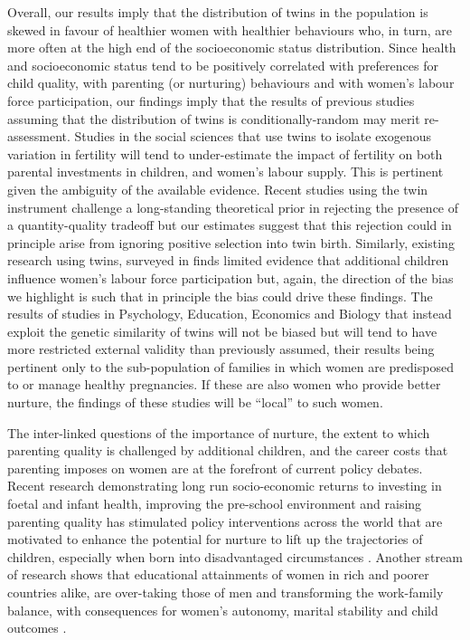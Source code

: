 \documentclass[11pt]{article}
\begin{document}
Overall, our results imply that the distribution of twins in the population is skewed in favour of healthier women with healthier behaviours who, in turn, are more often at the high end of the socioeconomic status distribution. Since health and socioeconomic status tend to be positively correlated with preferences for child quality, with parenting (or nurturing) behaviours and with women's labour force participation, our findings imply that the results of previous studies assuming that the distribution of twins is conditionally-random may merit re-assessment. Studies in the social sciences that use twins to isolate exogenous variation in fertility will tend to under-estimate the impact of fertility on both parental investments in children, and women's labour supply. This is pertinent given the ambiguity of the available evidence. Recent studies using the twin instrument challenge a long-standing theoretical prior \cite{BeckerTomes1976} in rejecting the presence of a quantity-quality tradeoff \cite{Blacketal2005,Angristetal2010} but our estimates suggest that this rejection could in principle arise from ignoring positive selection into twin birth. Similarly, existing research using twins, surveyed in \cite{Lundborgetal2014} finds limited evidence that additional children influence women's labour force participation but, again, the direction of the bias we highlight is such that in principle the bias could drive these findings. The results of studies in Psychology, Education, Economics and Biology that instead exploit the genetic similarity of twins will not be biased but will tend to have more restricted external validity than previously assumed, their results being pertinent only to the sub-population of families in which women are predisposed to or manage healthy pregnancies. If these are also women who provide better nurture, the findings of these studies will be ``local'' to such women.

The inter-linked questions of the importance of nurture, the extent to which parenting quality is challenged by additional children, and the career costs that parenting imposes on women are at the forefront of current policy debates. Recent research demonstrating long run socio-economic returns to investing in foetal and infant health, improving the pre-school environment and raising parenting quality has stimulated policy interventions across the world that are motivated to enhance the potential for nurture to lift up the trajectories of children, especially when born into disadvantaged circumstances \cite{Heckmanetal2010,AlmondCurrie2011,Carneiroetal2015}. Another stream of research shows that educational attainments of women in rich and poorer countries alike, are over-taking those of men and transforming the work-family balance, with consequences for women's autonomy, marital stability and child outcomes \cite{Rendall2010,NewmanOlivetti2016,Lundbergetal2016}. 
\end{document}
